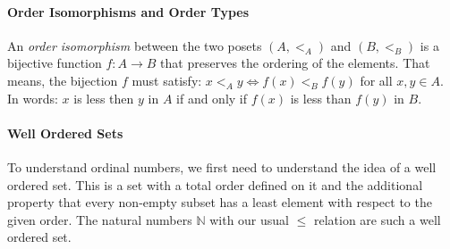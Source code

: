\paragraph{Order Isomorphisms and Order Types}
An \emph{order isomorphism} between the two posets $(A, <_A)$ and $(B, <_B)$ is a bijective function $f: A \rightarrow B$ that preserves the ordering of the elements. That means, the bijection $f$ must satisfy: $x <_A y \Leftrightarrow f(x) <_B f(y)$ for all $x,y \in A$. In words: $x$ is less then $y$ in $A$ if and only if $f(x)$ is less than $f(y)$ in $B$. 







\paragraph{Well Ordered Sets} To understand ordinal numbers, we first need to understand the idea of a well ordered set. This is a set with a total order defined on it and the additional property that every non-empty subset has a least element with respect to the given order. The natural numbers $\mathbb{N}$ with our usual $\leq$ relation are such a well ordered set. 


